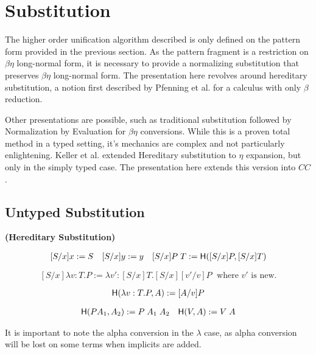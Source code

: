 \section{Substitution}

The higher order unification algorithm described is only defined on the pattern form provided in the previous section.
As the pattern fragment is a restriction on $\beta\eta$ long-normal form, it is necessary to provide a normalizing
substitution that preserves $\beta\eta$ long-normal form.  The presentation here
revolves around hereditary substitution, a notion first described by Pfenning et al. \citep{pfenning1991logic} for
a calculus with only $\beta$ reduction.

Other presentations are possible, such as traditional substitution followed by Normalization by Evaluation 
for $\beta\eta$ conversions\citep{abel2010towards}. 
While this is a proven total method in a typed setting, it's mechanics
are complex and not particularly enlightening.  
Keller et al. \citep{keller2010normalization}
extended Hereditary substitution to $\eta$ expansion, but only in the simply typed case. 
The presentation here extends this version into $CC$.

\subsection{Untyped Substitution}

\begin{definition}
\textbf{(Hereditary Substitution)} 

\[ \begin{array}[3]{llr}
[ S / x ] x := S
&
[S / x] y := y
&
[S / x] P\;T := \m{H}([S/x] P, [S/x]T)
\end{array} \]

\[
[S / x] \lambda v : T . P := \lambda v' : [S/x]T . [S/x][v'/v]P
\;
\text{  where $v'$ is new.}
\]

\[ 
\mathsf{H}(\lambda v : T . P , A) := [A/v] P
\]

\[ \begin{array}[2]{lr}
\m{H}(P A_1 , A_2) := P\;A_1\;A_2
&
\m{H}(V , A) := V\; A
\end{array} \]

\label{def:shered}
\end{definition}

It is important to note the alpha conversion in the $\lambda$ case, as alpha conversion will be lost on 
some terms when implicits are added.

